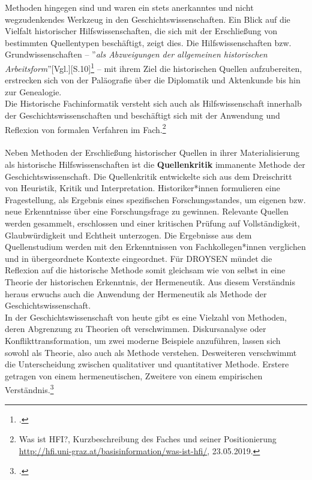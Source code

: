 \documentclass[12pt,a4paper]{article}
\begin{document}
Methoden hingegen sind und waren ein stets anerkanntes und nicht wegzudenkendes Werkzeug in den Geschichtswissenschaften. Ein Blick auf die Vielfalt historischer Hilfswissenschaften, die sich mit der Erschließung von bestimmten Quellentypen beschäftigt, zeigt dies. Die Hilfswissenschaften bzw. Grundwissenschaften -- ''\textit{als Abzweigungen der allgemeinen historischen Arbeitsform}''[Vgl.][S.10]\footcite{von2007werkzeug} -- mit ihrem Ziel die historischen Quellen aufzubereiten, erstrecken sich von der Paläografie über die Diplomatik und Aktenkunde bis hin zur Genealogie.
\\
Die Historische Fachinformatik versteht sich auch als Hilfswissenschaft innerhalb der Geschichtswissenschaften und beschäftigt sich mit der Anwendung und Reflexion von formalen Verfahren im Fach.\footnote{Was ist HFI?, Kurzbeschreibung des Faches und seiner Positionierung \protect\url{http://hfi.uni-graz.at/basisinformation/was-ist-hfi/}, 23.05.2019.} 
\\
\\
Neben Methoden der Erschließung historischer Quellen in ihrer Materialisierung als historische Hilfswissenschaften ist die \textbf{Quellenkritik} immanente Methode der Geschichtswissenschaft. Die Quellenkritik entwickelte sich aus dem Dreischritt von Heuristik, Kritik und Interpretation. Historiker*innen formulieren eine Fragestellung, als Ergebnis eines spezifischen Forschungsstandes, um eigenen bzw. neue  Erkenntnisse über eine Forschungsfrage zu gewinnen. Relevante Quellen werden gesammelt, erschlossen und einer kritischen Prüfung auf Vollständigkeit, Glaubwürdigkeit und Echtheit unterzogen. Die Ergebnisse aus dem Quellenstudium werden mit den Erkenntnissen von Fachkollegen*innen verglichen und in übergeordnete Kontexte eingeordnet. Für DROYSEN mündet die Reflexion auf die historische Methode somit gleichsam wie von selbst in eine Theorie der historischen Erkenntnis, der Hermeneutik. Aus diesem Verständnis heraus erwuchs auch die Anwendung der Hermeneutik als Methode der Geschichtswissenschaft.
\\
In der Geschichtswissenschaft von heute gibt es eine Vielzahl von Methoden, deren Abgrenzung zu Theorien oft verschwimmen. Diskursanalyse oder Konflikttransformation, um zwei moderne Beispiele anzuführen, lassen sich sowohl als Theorie, also auch als Methode verstehen. Desweiteren verschwimmt die Unterscheidung zwischen qualitativer und quantitativer Methode. Erstere getragen von einem hermeneutischen, Zweitere von einem empirischen Verständnis.\footcite[][S.2-5]{sokollgrundlagen} 
\end{document}
